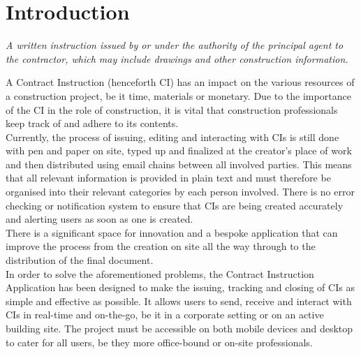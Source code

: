 \documentclass[11pt]{article}
\newcommand{\projectName}{Contract Instruction Application}
\begin{document}
\section{Introduction}
\begin{center}
\begin{tcolorbox}[skin=widget,
boxrule=1mm,
coltitle=black,
colframe=blue!45!white,
colback=blue!15!white,
width=(.9\linewidth),before=\hfill,after=\hfill,
adjusted title={CONTRACT INSTRUCTION}]
\textit{A written instruction issued by or under the authority of the principal agent to the contractor, which may include drawings and other construction information.}
\tcblower
\cite{ciDefinition}
\end{tcolorbox}
\end{center}
\begin{flushleft}
A Contract Instruction (henceforth CI) has an impact on the various resources of a construction project, be it time, materials or monetary. Due to the importance of the CI in the role of construction, it is vital that construction professionals keep track of and adhere to its contents.\\[0.5cm]

Currently, the process of issuing, editing and interacting with CIs is still done with pen and paper on site, typed up and finalized at the creator's place of work and then distributed using email chains between all involved parties. This means that all relevant information is provided in plain text and must therefore be organised into their relevant categories by each person involved. There is no error checking or notification system to ensure that CIs are being created accurately and alerting users as soon as one is created.\\[0.5cm]

There is a significant space for innovation and a bespoke application that can improve the process from the creation on site all the way through to the distribution of the final document.\\[0.5cm]

In order to solve the aforementioned problems, the \projectName{} has been designed to make the issuing, tracking and closing of CIs as simple and effective as possible. It allows users to send, receive and interact with CIs in real-time and on-the-go, be it in a corporate setting or on an active building site. The project must be accessible on both mobile devices and desktop to cater for all users, be they more office-bound or on-site professionals.\\[0.5cm]


\end{flushleft}
\end{document}
